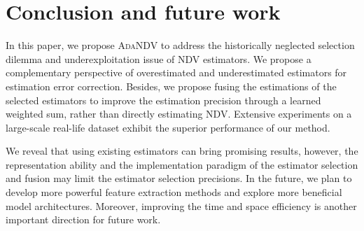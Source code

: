 \section{Conclusion and future work}
In this paper, we propose \textsc{AdaNDV} to address the historically neglected selection dilemma and underexploitation issue of NDV estimators. We propose a complementary perspective of overestimated and underestimated estimators for estimation error correction. Besides, we propose fusing the estimations of the selected estimators to improve the estimation precision through a learned weighted sum, rather than directly estimating NDV. Extensive experiments on a large-scale real-life dataset exhibit the superior performance of our method.

We reveal that using existing estimators can bring promising results, however, the representation ability and the implementation paradigm of the estimator selection and fusion may limit the estimator selection precisions. In the future, we plan to develop more powerful feature extraction methods and explore more beneficial model architectures. Moreover, improving the time and space efficiency is another important direction for future work. 


